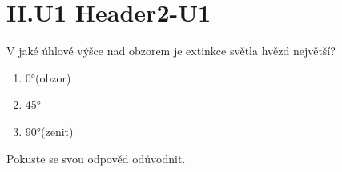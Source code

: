 \documentclass{../../../../style/mkimain}
\begin{document}
\section*{II.U1 Header2-U1}
\noindent
V jaké úhlové výšce nad obzorem je extinkce světla hvězd největší?

\begin{enumerate}
    \item \ang{0}(obzor)
    \item \ang{45}
    \item \ang{90}(zenit)
\end{enumerate}
Pokuste se svou odpověd odůvodnit.
\end{document}
